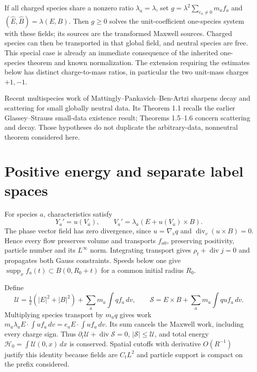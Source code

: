 \documentclass[11pt]{article}
\newcommand{\supp}{\operatorname{supp}}
\newcommand{\diver}{\operatorname{div}}
\theoremstyle{remark}\newtheorem{remark}[theorem]{Remark}
\numberwithin{equation}{section}
\begin{document}
If all charged species share a nonzero ratio $\lambda_a=\lambda$, set
$g=\lambda^2\sum_{e_a\ne0}m_af_a$ and
$(\widehat E,\widehat B)=\lambda(E,B)$. Then $g\ge0$ solves the
unit-coefficient one-species system with these fields; its sources are the
transformed Maxwell sources. Charged species can then be transported in
that global field, and neutral species are free. This special case is already
an immediate consequence of the inherited one-species theorem and known
normalization. The extension requiring the estimates below has distinct
charge-to-mass ratios, in particular the two unit-mass charges $+1,-1$.

Recent multispecies work of Mattingly--Pankavich--Ben-Artzi
\cite{MPB2026} sharpens decay and scattering for small globally neutral data.
Its Theorem 1.1 recalls the earlier Glassey--Strauss small-data existence
result; Theorems 1.5--1.6 concern scattering and decay. Those hypotheses do
not duplicate the arbitrary-data, nonneutral theorem considered here.

\section{Positive energy and separate label spaces}
For species $a$, characteristics satisfy
\begin{equation}\label{eq:flow}
 Y_a'=u(V_a),\qquad V_a'=\lambda_a(E+u(V_a)\times B).
\end{equation}
The phase vector field has zero divergence, since $u=\nabla_v q$ and
$\diver_v(u\times B)=0$. Hence every flow preserves volume and transports
$f_{a0}$, preserving positivity, particle number and its $L^\infty$ norm.
Integrating transport gives $\rho_t+\diver j=0$ and propagates both Gauss
constraints. Speeds below one give $\supp_x f_a(t)\subset B(0,R_0+t)$ for a
common initial radius $R_0$.

Define
\begin{equation}\label{eq:energy}
 \mathcal U=\tfrac12(|E|^2+|B|^2)+\sum_a m_a\int qf_a\,dv,
 \qquad\mathcal S=E\times B+\sum_a m_a\int quf_a\,dv.
\end{equation}
Multiplying species transport by $m_aq$ gives work
$m_a\lambda_a E\cdot\int uf_a\,dv=e_a E\cdot\int uf_a\,dv$.
Its sum cancels the Maxwell work, including every charge sign. Thus
$\partial_t\mathcal U+\diver\mathcal S=0$, $|\mathcal S|\le\mathcal U$,
and total energy $\mathcal H_0=\int\mathcal U(0,x)\,dx$ is conserved.
Spatial cutoffs with derivative $O(R^{-1})$ justify this identity because
fields are $C_tL^2$ and particle support is compact on the prefix considered.
\end{document}
